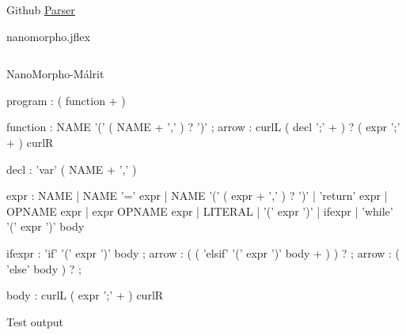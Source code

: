 \documentclass{homework}
\begin{document}

\begin{question}{Github}
  \href{https://github.com/slowpokesheep/thydendur/parser}{Parser}\\
\end{question}

\begin{question}{nanomorpho.jflex}
\end{question}
\begin{answer}
\begin{verbatim}

\end{verbatim}
\end{answer}

\newpage

\begin{question}{NanoMorpho-Málrit}
\end{question}
\begin{answer}
  \begin{rail}
    program : ( function + )
  \end{rail}
  \begin{rail}
    function  : NAME '('  ( NAME + ',' ) ? ')' ;
    arrow     : curlL ( decl ';' + ) ? ( expr ';' + ) curlR
  \end{rail}
  \begin{rail}
    decl : 'var' ( NAME + ',' )
  \end{rail}
  \begin{rail}
    expr  : NAME
          | NAME '=' expr
          | NAME '('  ( expr + ',' ) ?   ')'
          | 'return' expr
          | OPNAME expr
          | expr OPNAME expr
          | LITERAL
          | '('  expr  ')'
          | ifexpr
          | 'while' '('  expr  ')' body
  \end{rail}
  \begin{rail}
    ifexpr  : 'if' '('  expr  ')' body ;
    arrow   : (  ( 'elsif' '('  expr  ')'  body  + )  ) ? ;
    arrow   : ( 'else' body ) ? ;
  \end{rail}
  \begin{rail}
    body : curlL ( expr ';' + ) curlR
  \end{rail}
\end{answer}

\begin{question}{Test output}
  
\end{question}
\begin{answer}
  \begin{figure}[h]
    \centering
  \end{figure}
\end{answer}
\end{document}
